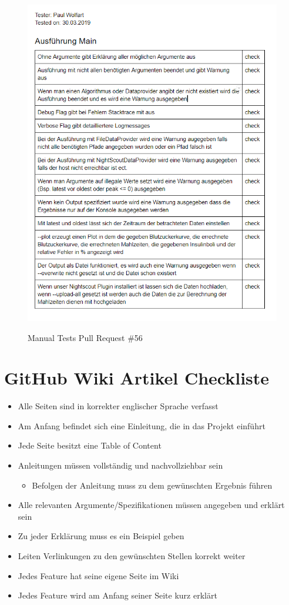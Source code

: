 \documentclass[accentcolor=tud0b,12pt,paper=a4]{tudreport}
\begin{document}
\begin{figure}[h]
\centering
\caption{Manual Tests Pull Request \#56}
\includegraphics[width=\textwidth,height=\textheight,keepaspectratio]{pr-tests-56}
\label{pr-tests:56}
\end{figure}
	
\section{GitHub Wiki Artikel Checkliste}
\begin{itemize}
\item Alle Seiten sind in korrekter englischer Sprache verfasst
\item Am Anfang befindet sich eine Einleitung, die in das Projekt einführt
\item Jede Seite besitzt eine Table of Content
\item Anleitungen müssen vollständig und nachvollziehbar sein
	\begin{itemize}
	\item Befolgen der Anleitung muss zu dem gewünschten Ergebnis führen
	\end{itemize}
\item Alle relevanten Argumente/Spezifikationen müssen angegeben und erklärt sein
\item Zu jeder Erklärung muss es ein Beispiel geben
\item Leiten Verlinkungen zu den gewünschten Stellen korrekt weiter
\item Jedes Feature hat seine eigene Seite im Wiki
\item Jedes Feature wird am Anfang seiner Seite kurz erklärt
\end{itemize}
\end{document}
